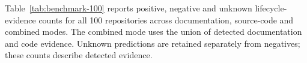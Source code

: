 Table~\ref{tab:benchmark-100} reports positive, negative and unknown lifecycle-evidence counts for all 100 repositories across documentation, source-code and combined modes. The combined mode uses the union of detected documentation and code evidence. Unknown predictions are retained separately from negatives; these counts describe detected evidence.
